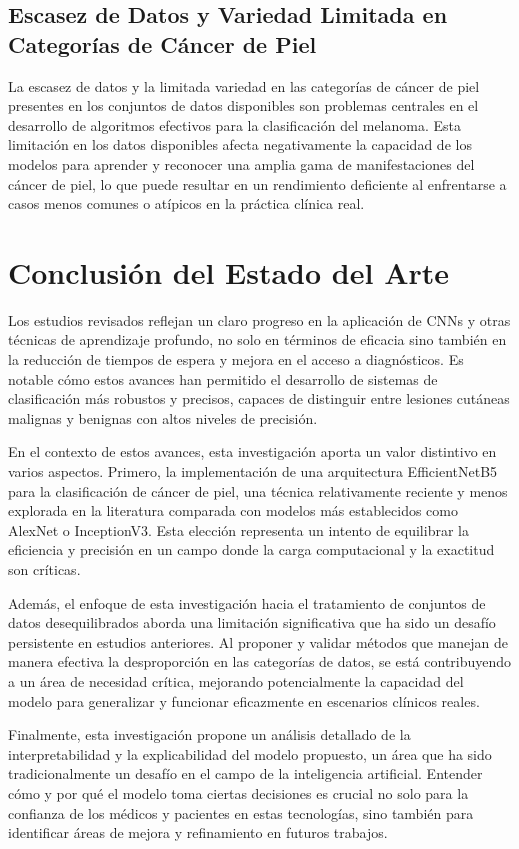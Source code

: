\subsection*{Escasez de Datos y Variedad Limitada en Categorías de Cáncer de Piel}
La escasez de datos y la limitada variedad en las categorías de cáncer de piel presentes en los conjuntos de datos disponibles son problemas centrales en el desarrollo de algoritmos efectivos para la clasificación del melanoma. Esta limitación en los datos disponibles afecta negativamente la capacidad de los modelos para aprender y reconocer una amplia gama de manifestaciones del cáncer de piel, lo que puede resultar en un rendimiento deficiente al enfrentarse a casos menos comunes o atípicos en la práctica clínica real.%

\section*{Conclusión del Estado del Arte}

Los estudios revisados reflejan un claro progreso en la aplicación de CNNs y otras técnicas de aprendizaje profundo, no solo en términos de eficacia sino también en la reducción de tiempos de espera y mejora en el acceso a diagnósticos. Es notable cómo estos avances han permitido el desarrollo de sistemas de clasificación más robustos y precisos, capaces de distinguir entre lesiones cutáneas malignas y benignas con altos niveles de precisión.

En el contexto de estos avances, esta investigación aporta un valor distintivo en varios aspectos. Primero, la implementación de una arquitectura EfficientNetB5 para la clasificación de cáncer de piel, una técnica relativamente reciente y menos explorada en la literatura comparada con modelos más establecidos como AlexNet o InceptionV3. Esta elección representa un intento de equilibrar la eficiencia y precisión en un campo donde la carga computacional y la exactitud son críticas.

Además, el enfoque de esta investigación hacia el tratamiento de conjuntos de datos desequilibrados aborda una limitación significativa que ha sido un desafío persistente en estudios anteriores. Al proponer y validar métodos que manejan de manera efectiva la desproporción en las categorías de datos, se está contribuyendo a un área de necesidad crítica, mejorando potencialmente la capacidad del modelo para generalizar y funcionar eficazmente en escenarios clínicos reales.

Finalmente, esta investigación propone un análisis detallado de la interpretabilidad y la explicabilidad del modelo propuesto, un área que ha sido tradicionalmente un desafío en el campo de la inteligencia artificial. Entender cómo y por qué el modelo toma ciertas decisiones es crucial no solo para la confianza de los médicos y pacientes en estas tecnologías, sino también para identificar áreas de mejora y refinamiento en futuros trabajos.